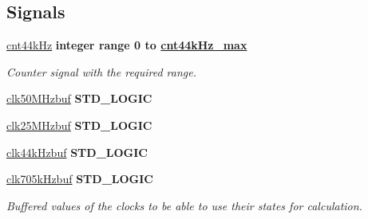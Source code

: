 \subsection*{Signals}
 \begin{DoxyCompactItemize}
\item 
\hypertarget{classclk__divide_1_1behavioral_a119377ea25e90c9e0302742fb8d75456}{\hyperlink{classclk__divide_1_1behavioral_a119377ea25e90c9e0302742fb8d75456}{cnt44k\-Hz} {\bfseries \textcolor{comment}{integer}\textcolor{vhdlchar}{ }\textcolor{vhdlkeyword}{range}\textcolor{vhdlchar}{ } \textcolor{vhdldigit}{0} \textcolor{vhdlchar}{ }\textcolor{vhdlchar}{ }\textcolor{vhdlchar}{ }\textcolor{vhdlkeyword}{to}\textcolor{vhdlchar}{ }\textcolor{vhdlchar}{ }\textcolor{vhdlchar}{ }{\bfseries \hyperlink{classclk__divide_1_1behavioral_a8f64c0dba167ef17ec71f04787ff5a8a}{cnt44k\-Hz\-\_\-max}} \textcolor{vhdlchar}{ }} }\label{classclk__divide_1_1behavioral_a119377ea25e90c9e0302742fb8d75456}

\begin{DoxyCompactList}\small\item\em Counter signal with the required range. \end{DoxyCompactList}\item 
\hypertarget{classclk__divide_1_1behavioral_ab62cba3781d0056853b0d98ca65ea351}{\hyperlink{classclk__divide_1_1behavioral_ab62cba3781d0056853b0d98ca65ea351}{clk50\-M\-Hzbuf} {\bfseries \textcolor{comment}{S\-T\-D\-\_\-\-L\-O\-G\-I\-C}\textcolor{vhdlchar}{ }} }\label{classclk__divide_1_1behavioral_ab62cba3781d0056853b0d98ca65ea351}

\item 
\hypertarget{classclk__divide_1_1behavioral_aaa88cd1782ca3c642feace13266e5f9f}{\hyperlink{classclk__divide_1_1behavioral_aaa88cd1782ca3c642feace13266e5f9f}{clk25\-M\-Hzbuf} {\bfseries \textcolor{comment}{S\-T\-D\-\_\-\-L\-O\-G\-I\-C}\textcolor{vhdlchar}{ }} }\label{classclk__divide_1_1behavioral_aaa88cd1782ca3c642feace13266e5f9f}

\item 
\hypertarget{classclk__divide_1_1behavioral_a4b92d2406ba07f6283fa1d9ad64e472d}{\hyperlink{classclk__divide_1_1behavioral_a4b92d2406ba07f6283fa1d9ad64e472d}{clk44k\-Hzbuf} {\bfseries \textcolor{comment}{S\-T\-D\-\_\-\-L\-O\-G\-I\-C}\textcolor{vhdlchar}{ }} }\label{classclk__divide_1_1behavioral_a4b92d2406ba07f6283fa1d9ad64e472d}

\item 
\hypertarget{classclk__divide_1_1behavioral_a7683c8432ba1dc0ce9ac4515e56c9d4f}{\hyperlink{classclk__divide_1_1behavioral_a7683c8432ba1dc0ce9ac4515e56c9d4f}{clk705k\-Hzbuf} {\bfseries \textcolor{comment}{S\-T\-D\-\_\-\-L\-O\-G\-I\-C}\textcolor{vhdlchar}{ }} }\label{classclk__divide_1_1behavioral_a7683c8432ba1dc0ce9ac4515e56c9d4f}

\begin{DoxyCompactList}\small\item\em Buffered values of the clocks to be able to use their states for calculation. \end{DoxyCompactList}\end{DoxyCompactItemize}


